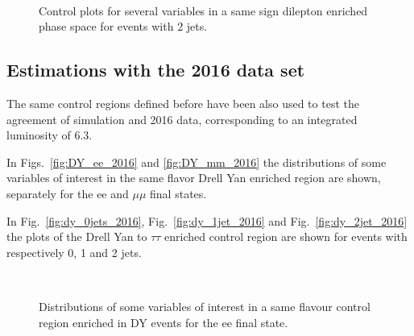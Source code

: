\begin{figure}[!h]
\centering
{}
\\
\caption{Control plots for several variables in a same sign dilepton enriched phase space for events with 2 jets.}\label{fig:samesign_2jet}
\end{figure}




















\clearpage




\subsection{Estimations with the 2016 data set}

The same control regions defined before have been also used to test the agreement of simulation and 2016 data, corresponding to an integrated luminosity of 6.3\ifb.

In Figs.~\ref{fig:DY_ee_2016} and \ref{fig:DY_mm_2016} the distributions of some variables of interest in the same flavor Drell Yan enriched region are shown, separately for the ee and $\mu\mu$ final states.

In Fig.~\ref{fig:dy_0jets_2016}, Fig.~\ref{fig:dy_1jet_2016} and Fig.~\ref{fig:dy_2jet_2016} the plots of the Drell Yan to $\tau\tau$ enriched control region are shown for events with respectively 0, 1 and 2 jets.\\


\begin{figure}[htb]
\centering
{}
\\
\caption{
   Distributions of some variables of interest in a same flavour control region enriched in DY events for the ee final state.}
    \label{fig:DY_ee}
\end{figure}

